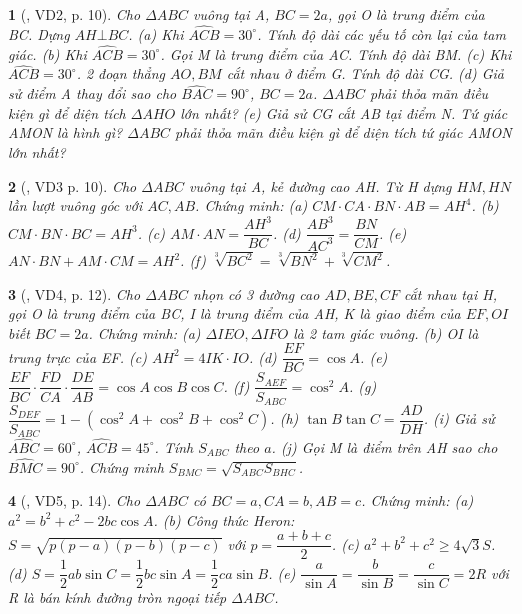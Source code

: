 \documentclass{article}
\newtheorem{baitoan}{}
\begin{document}
\begin{baitoan}[\cite{Kien_hinh_hoc_9}, VD2, p. 10]
	Cho $\Delta ABC$ vuông tại A, $BC = 2a$, gọi O là trung điểm của BC. Dựng $AH\bot BC$. (a) Khi $\widehat{ACB} = 30^\circ$. Tính độ dài các yếu tố còn lại của tam giác. (b) Khi $\widehat{ACB} = 30^\circ$. Gọi M là trung điểm của AC. Tính độ dài BM. (c) Khi $\widehat{ACB} = 30^\circ$. 2 đoạn thẳng $AO,BM$ cắt nhau ở điểm G. Tính độ dài CG. (d) Giả sử điểm A thay đổi sao cho $\widehat{BAC} = 90^\circ$, $BC = 2a$. $\Delta ABC$ phải thỏa mãn điều kiện gì để diện tích $\Delta AHO$ lớn nhất? (e) Giả sử CG cắt AB tại điểm N. Tứ giác AMON là hình gì? $\Delta ABC$ phải thỏa mãn điều kiện gì để diện tích tứ giác AMON lớn nhất?
\end{baitoan}

\begin{baitoan}[\cite{Kien_hinh_hoc_9}, VD3 p. 10]
	Cho $\Delta ABC$ vuông tại A, kẻ đường cao AH. Từ H dựng $HM,HN$ lần lượt vuông góc với $AC,AB$. Chứng minh: (a) $CM\cdot CA\cdot BN\cdot AB = AH^4$. (b) $CM\cdot BN\cdot BC = AH^3$. (c) $AM\cdot AN = \dfrac{AH^3}{BC}$. (d) $\dfrac{AB^3}{AC^3} = \dfrac{BN}{CM}$. (e) $AN\cdot BN + AM\cdot CM = AH^2$. (f) $\sqrt[3]{BC^2} = \sqrt[3]{BN^2} + \sqrt[3]{CM^2}$.
\end{baitoan}

\begin{baitoan}[\cite{Kien_hinh_hoc_9}, VD4, p. 12]
	Cho $\Delta ABC$ nhọn có 3 đường cao $AD,BE,CF$ cắt nhau tại H, gọi O là trung điểm của BC, I là trung điểm của AH, K là giao điểm của $EF,OI$ biết $BC = 2a$. Chứng minh: (a)  $\Delta IEO,\Delta IFO$ là 2 tam giác vuông. (b) OI là trung trực của EF. (c) $AH^2 = 4IK\cdot IO$. (d) $\dfrac{EF}{BC} = \cos A$. (e) $\dfrac{EF}{BC}\cdot\dfrac{FD}{CA}\cdot\dfrac{DE}{AB} = \cos A\cos B\cos C$. (f) $\dfrac{S_{AEF}}{S_{ABC}} = \cos^2A$. (g) $\dfrac{S_{DEF}}{S_{ABC}} = 1 - (\cos^2A + \cos^2B + \cos^2C)$. (h) $\tan B\tan C = \dfrac{AD}{DH}$. (i) Giả sử $\widehat{ABC} = 60^\circ$, $\widehat{ACB} = 45^\circ$. Tính $S_{ABC}$ theo $a$. (j) Gọi M là điểm trên AH sao cho $\widehat{BMC} = 90^\circ$. Chứng minh $S_{BMC} = \sqrt{S_{ABC}S_{BHC}}$.
\end{baitoan}

\begin{baitoan}[\cite{Kien_hinh_hoc_9}, VD5, p. 14]
	Cho $\Delta ABC$ có $BC = a,CA = b,AB = c$. Chứng minh: (a) $a^2 = b^2 + c^2 - 2bc\cos A$. (b) Công thức Heron: $S = \sqrt{p(p - a)(p - b)(p - c)}$ với $p = \dfrac{a + b + c}{2}$. (c) $a^2 + b^2 + c^2\ge4\sqrt{3}S$. (d) $S = \dfrac{1}{2}ab\sin C = \dfrac{1}{2}bc\sin A = \dfrac{1}{2}ca\sin B$. (e) $\dfrac{a}{\sin A} = \dfrac{b}{\sin B} = \dfrac{c}{\sin C} = 2R$ với R là bán kính đường tròn ngoại tiếp $\Delta ABC$.
\end{baitoan}
\end{document}
